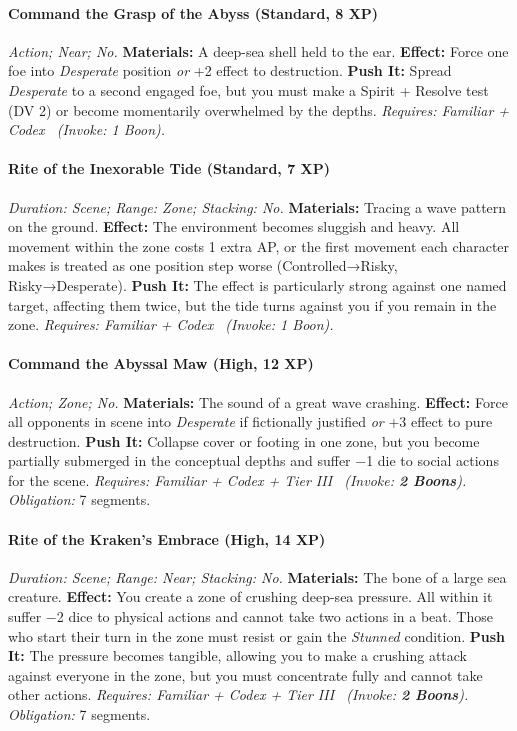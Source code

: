 \documentclass[12pt,twoside]{book}
\begin{document}
\paragraph{Command the Grasp of the Abyss (Standard, 8 XP)} \emph{Action; Near; No.}
\textbf{Materials:} A deep-sea shell held to the ear.
\textbf{Effect:} Force one foe into \emph{Desperate} position \emph{or} +2 effect to destruction.
\textbf{Push It:} Spread \emph{Desperate} to a second engaged foe, but you must make a Spirit + Resolve test (DV 2) or become momentarily overwhelmed by the depths.
\emph{Requires: Familiar + Codex \ (\textit{Invoke:} 1 Boon).}
\paragraph{Rite of the Inexorable Tide (Standard, 7 XP)} \emph{Duration: Scene; Range: Zone; Stacking: No.}
\textbf{Materials:} Tracing a wave pattern on the ground.
\textbf{Effect:} The environment becomes sluggish and heavy. All movement within the zone costs 1 extra AP, or the first movement each character makes is treated as one position step worse (Controlled→Risky, Risky→Desperate).
\textbf{Push It:} The effect is particularly strong against one named target, affecting them twice, but the tide turns against you if you remain in the zone.
\emph{Requires: Familiar + Codex \ (\textit{Invoke:} 1 Boon).}
\paragraph{Command the Abyssal Maw (High, 12 XP)} \emph{Action; Zone; No.}
\textbf{Materials:} The sound of a great wave crashing.
\textbf{Effect:} Force all opponents in scene into \emph{Desperate} if fictionally justified \emph{or} +3 effect to pure destruction.
\textbf{Push It:} Collapse cover or footing in one zone, but you become partially submerged in the conceptual depths and suffer −1 die to social actions for the scene.
\emph{Requires: Familiar + Codex + Tier III \ (\textit{Invoke:} \textbf{2 Boons}).}
\emph{Obligation:} 7 segments.

\paragraph{Rite of the Kraken's Embrace (High, 14 XP)} \emph{Duration: Scene; Range: Near; Stacking: No.}
\textbf{Materials:} The bone of a large sea creature.
\textbf{Effect:} You create a zone of crushing deep-sea pressure. All within it suffer −2 dice to physical actions and cannot take two actions in a beat. Those who start their turn in the zone must resist or gain the \emph{Stunned} condition.
\textbf{Push It:} The pressure becomes tangible, allowing you to make a crushing attack against everyone in the zone, but you must concentrate fully and cannot take other actions.
\emph{Requires: Familiar + Codex + Tier III \ (\textit{Invoke:} \textbf{2 Boons}).}
\emph{Obligation:} 7 segments.
\end{document}
